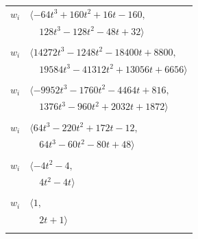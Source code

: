 \documentclass[11pt]{article}
\begin{document}
\begin{longtable}{@{}ll@{}}
$w_i$ & $\langle -64t^{3}+160t^{2}+16t-160,$\\
 & $\quad 128t^{3}-128t^{2}-48t+32\rangle$\\
\addlinespace[2pt]
\multicolumn{2}{@{}p{0.97\textwidth}@{}}{$i=22$, $D_i=256$, $e_i=3$, $\rho_{ij}$: $1{:}2, \allowbreak 2{:}3, \allowbreak 6{:}2, \allowbreak 7{:}1, \allowbreak 10{:}3, \allowbreak 11{:}1, \allowbreak 20{:}3, \allowbreak 25{:}2, \allowbreak 27{:}1, \allowbreak 28{:}3, \allowbreak 29{:}1, \allowbreak 31{:}2, \allowbreak 38{:}2, \allowbreak 39{:}3$}\\
$w_i$ & $\langle 14272t^{3}-1248t^{2}-18400t+8800,$\\
 & $\quad 19584t^{3}-41312t^{2}+13056t+6656\rangle$\\
\addlinespace[2pt]
\multicolumn{2}{@{}p{0.97\textwidth}@{}}{$i=23$, $D_i=64$, $e_i=1$, $\rho_{ij}$: $2{:}3, \allowbreak 10{:}2, \allowbreak 14{:}2, \allowbreak 15{:}3, \allowbreak 18{:}3, \allowbreak 19{:}1, \allowbreak 20{:}1, \allowbreak 28{:}2, \allowbreak 31{:}2, \allowbreak 37{:}3, \allowbreak 40{:}2$}\\
$w_i$ & $\langle -9952t^{3}-1760t^{2}-4464t+816,$\\
 & $\quad 1376t^{3}-960t^{2}+2032t+1872\rangle$\\
\addlinespace[2pt]
\multicolumn{2}{@{}p{0.97\textwidth}@{}}{$i=24$, $D_i=16$, $\rho_{ij}$: $0{:}1, \allowbreak 1{:}3, \allowbreak 25{:}1, \allowbreak 29{:}2, \allowbreak 40{:}2$}\\
$w_i$ & $\langle 64t^{3}-220t^{2}+172t-12,$\\
 & $\quad 64t^{3}-60t^{2}-80t+48\rangle$\\
\addlinespace[2pt]
\multicolumn{2}{@{}p{0.97\textwidth}@{}}{$i=25$, $D_i=2$, $\rho_{ij}$: $7{:}1, \allowbreak 8{:}1, \allowbreak 11{:}3, \allowbreak 12{:}3, \allowbreak 15{:}2, \allowbreak 20{:}3, \allowbreak 21{:}1, \allowbreak 22{:}2, \allowbreak 24{:}3$}\\
$w_i$ & $\langle -4t^{2}-4,$\\
 & $\quad 4t^{2}-4t\rangle$\\
\addlinespace[2pt]
\multicolumn{2}{@{}p{0.97\textwidth}@{}}{$i=26$, $D_i=2$, $\rho_{ij}$: $5{:}2, \allowbreak 7{:}2, \allowbreak 12{:}2$}\\
$w_i$ & $\langle 1,$\\
 & $\quad 2t+1\rangle$\\
\addlinespace[2pt]
\multicolumn{2}{@{}p{0.97\textwidth}@{}}{$i=27$, $D_i=4$, $\rho_{ij}$: $2{:}3, \allowbreak 3{:}1, \allowbreak 10{:}3, \allowbreak 11{:}3, \allowbreak 14{:}3, \allowbreak 16{:}3, \allowbreak 22{:}3, \allowbreak 37{:}1$}\\

\end{longtable}
\end{document}
